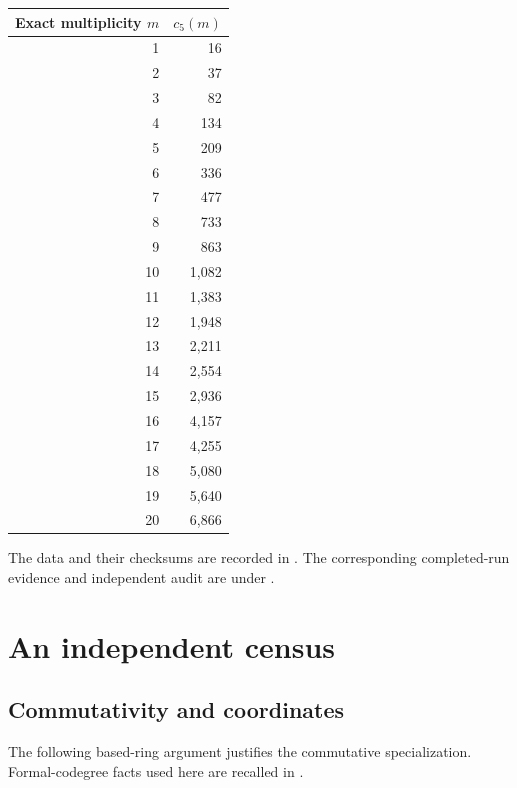 \documentclass[11pt,a4paper]{article}
\theoremstyle{definition}\newtheorem{definition}[theorem]{Definition}\newtheorem{remark}[theorem]{Remark}
\newcommand{\Rank}{5}
\begin{document}
\begin{center}\begin{tabular}{rr}\toprule Exact multiplicity $m$ & $c_{\Rank}(m)$\\\midrule
1 & 16\\
2 & 37\\
3 & 82\\
4 & 134\\
5 & 209\\
6 & 336\\
7 & 477\\
8 & 733\\
9 & 863\\
10 & 1,082\\
11 & 1,383\\
12 & 1,948\\
13 & 2,211\\
14 & 2,554\\
15 & 2,936\\
16 & 4,157\\
17 & 4,255\\
18 & 5,080\\
19 & 5,640\\
20 & 6,866\\
\bottomrule\end{tabular}\end{center}

The data and their checksums are recorded in . The corresponding completed-run evidence and independent audit are under .
\section{An independent census}\label{sec:data}
\subsection{Commutativity and coordinates}
The following based-ring argument justifies the commutative specialization. Formal-codegree facts used here are recalled in \cite{Ostrik}.
\end{document}
